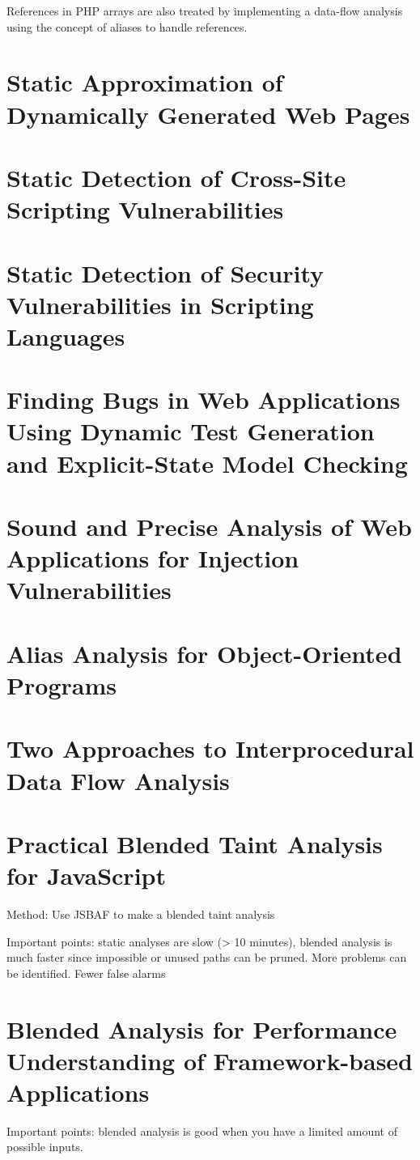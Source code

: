 References in PHP arrays are also treated by  implementing a data-flow analysis using the concept of aliases to handle references. 

\section{Static Approximation of Dynamically Generated Web Pages}

\section{Static Detection of Cross-Site Scripting Vulnerabilities}

\section{Static Detection of Security Vulnerabilities in Scripting Languages}

\section{Finding Bugs in Web Applications Using Dynamic Test Generation and Explicit-State Model Checking}

\section{Sound and Precise Analysis of Web Applications for Injection Vulnerabilities}

\section{Alias Analysis for Object-Oriented Programs}

\section{Two Approaches to Interprocedural Data Flow Analysis}

\section{Practical Blended Taint Analysis for JavaScript}
Method: Use JSBAF to make a blended taint analysis

Important points: static analyses are slow (> 10 minutes), blended analysis is much faster since impossible or unused paths can be pruned. More problems can be identified. Fewer false alarms

\section{Blended Analysis for Performance Understanding of Framework-based Applications}
Important points: blended analysis is good when you have a limited amount of possible inputs.
